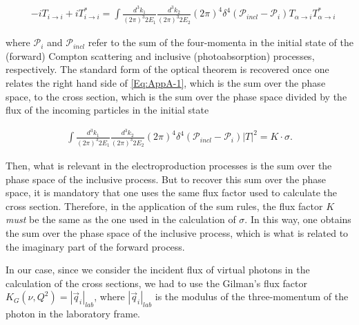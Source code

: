 \documentclass[prc,twocolumn,showpacs,preprintnumbers,amsmath,amssymb
,superscriptaddress,a4paper,nofootinbib
]{revtex4-1}
\begin{document}
\begin{widetext}
\begin{align}\label{Eq:AppA-1}
&- i T_{i\to i } + i T_{i\to i }^*= \int\!\!\!\! \frac{d^3 k_1 }{(2\pi)^3 2E_1} \frac{d^3 k_{2} }{(2\pi)^3 2E_{2}} (2\pi)^4 \delta^4 (\mathcal{P}_{incl} - \mathcal{P}_i) T_{\alpha \to i}  T_{\alpha \to i}^* 
\end{align}
\end{widetext}

where $\mathcal{P}_{i}$ and $\mathcal{P}_{incl}$ refer to the sum of the four-momenta in the initial state of the (forward) Compton scattering and inclusive (photoabsorption) processes, respectively.
The standard form of the optical theorem is recovered once one relates the right hand side of \eqref{Eq:AppA-1}, which is the sum over the phase space, to the cross section, which is the sum over the phase space divided by the flux of the incoming particles in the initial state

\begin{align}\label{Eq:AppA-2}
 \int\!\!\!\! \frac{d^3 k_1 }{(2\pi)^3 2E_1} \frac{d^3 k_{2} }{(2\pi)^3 2E_{2}} (2\pi)^4 \delta^4 (\mathcal{P}_{incl} - \mathcal{P}_i) |T|^2 = K\cdot \sigma .
\end{align}

Then, what is relevant in the electroproduction processes is the sum over the phase space of the inclusive process.
But to recover this sum over the phase space, it is mandatory that one uses the same flux factor used to calculate the cross section. 
Therefore, in the application of the sum rules, the flux factor $K$ {\itshape must} be the same as the one used in the calculation of $\sigma$.
In this way, one obtains the sum over the phase space of the inclusive process, which is what is related to the imaginary part of the forward process.

In our case, since we consider the incident flux of virtual photons in the calculation of the cross sections, we had to use the Gilman's flux factor $K_G(\nu,Q^2)=|\vec{q}_i|_{lab}$, where  $|\vec{q}_i|_{lab}$ is the modulus of the three-momentum of the photon in the laboratory frame.

\end{document}
